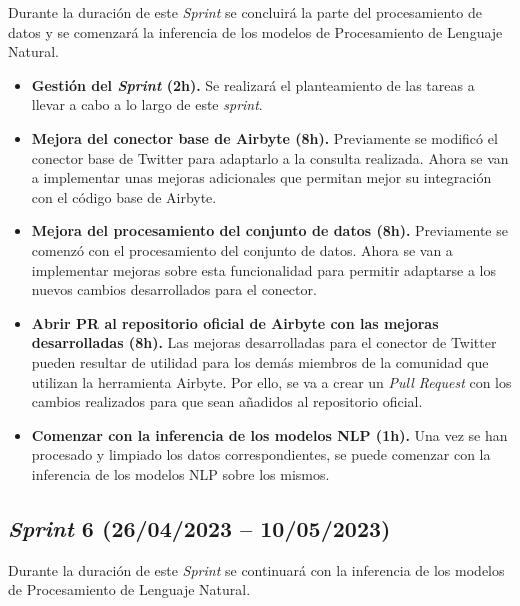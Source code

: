 Durante la duración de este \textit{Sprint} se concluirá la parte del procesamiento de datos y se comenzará la inferencia de los modelos de Procesamiento de Lenguaje Natural.

\begin{itemize}

    \item \textbf{Gestión del \textit{Sprint} (2h).} Se realizará el planteamiento de las tareas a llevar a cabo a lo largo de este \textit{sprint}.

    \item \textbf{Mejora del conector base de Airbyte (8h).} Previamente se modificó el conector base de Twitter para adaptarlo a la consulta realizada. Ahora se van a implementar unas mejoras adicionales que permitan mejor su integración con el código base de Airbyte.

    \item \textbf{Mejora del procesamiento del conjunto de datos (8h).} Previamente se comenzó con el procesamiento del conjunto de datos. Ahora se van a implementar mejoras sobre esta funcionalidad para permitir adaptarse a los nuevos cambios desarrollados para el conector.

    \item \textbf{Abrir PR al repositorio oficial de Airbyte con las mejoras desarrolladas (8h).} Las mejoras desarrolladas para el conector de Twitter pueden resultar de utilidad para los demás miembros de la comunidad que utilizan la herramienta Airbyte. Por ello, se va a crear un \textit{Pull Request} con los cambios realizados para que sean añadidos al repositorio oficial.

    \item \textbf{Comenzar con la inferencia de los modelos NLP (1h).} Una vez se han procesado y limpiado los datos correspondientes, se puede comenzar con la inferencia de los modelos NLP sobre los mismos.

\end{itemize}

\subsection{\textit{Sprint} 6 (26/04/2023 -- 10/05/2023)}

Durante la duración de este \textit{Sprint} se continuará con la inferencia de los modelos de Procesamiento de Lenguaje Natural.


